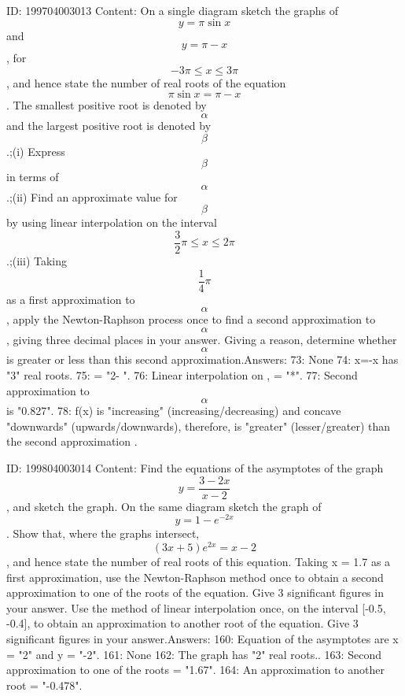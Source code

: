\documentclass{article}
\begin{document}
ID: 199704003013
Content:
On a single diagram sketch the graphs of \[y = \pi \sin x\] and \[y = \pi - x\], for \[-3\pi \leq x\leq 3\pi\], and hence state the number of real roots of the equation \[\pi \sin x = \pi - x\]. The smallest positive root is denoted by \[\alpha\] and the largest positive root is denoted by \[\beta\].;(i) Express \[\beta\] in terms of \[\alpha\].;(ii) Find an approximate value for \[\beta\] by using linear interpolation on the interval \[\frac {3}{2}\pi \leq x \leq 2\pi\].;(iii) Taking \[\frac {1}{4} \pi\] as a first approximation to \[\alpha\], apply the Newton-Raphson process once to find a second approximation to  \[\alpha\], giving three decimal places in your answer. Giving a reason, determine whether \[\alpha\] is greater or less than this second approximation.Answers:
73: None
74: \pi \sin x=\pi -x has "3" real roots.
75: \beta = "2\pi - \alpha".
76: Linear interpolation on , \space \beta = "*\pi".
77: Second approximation to  \[\alpha\] is "0.827".
78: f(x) is "increasing" (increasing/decreasing) and concave "downwards" (upwards/downwards), therefore, \alpha is "greater" (lesser/greater) than the second approximation .

ID: 199804003014
Content:
Find the equations of the asymptotes of the graph \[y = \frac {3 - 2x}{x - 2}\], and sketch the graph. On the same diagram sketch the graph of \[y = 1 - e^{-2x}\]. Show that, where the graphs intersect, \[(3x + 5)e^{2x} = x - 2\], and hence state the number of real roots of this equation. Taking x = 1.7 as a first approximation, use the Newton-Raphson method once to obtain a second approximation to one of the roots of the equation. Give 3 significant figures in your answer. Use the method of linear interpolation once, on the interval [-0.5, -0.4], to obtain an approximation to another root of the equation. Give 3 significant figures in your answer.Answers:
160: Equation of the asymptotes are x = "2" and y = "-2".
161: None
162: The graph has "2" real roots..
163: Second approximation to one of the roots = "1.67".
164: An approximation to another root = "-0.478".
\end{document}
